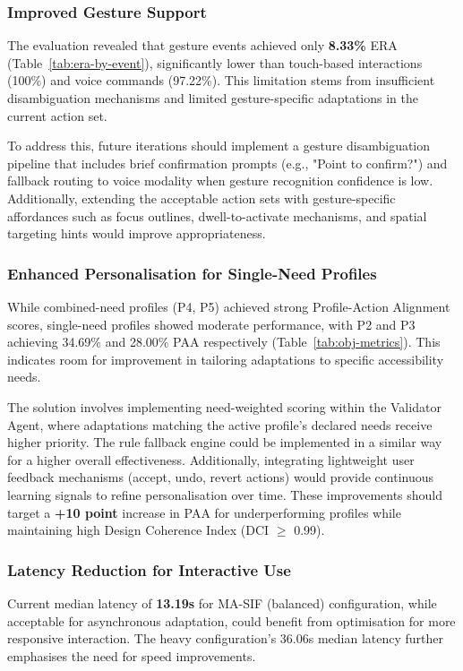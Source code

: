\subsubsection{Improved Gesture Support}
The evaluation revealed that gesture events achieved only \textbf{8.33\%} ERA (Table~\ref{tab:era-by-event}), significantly lower than touch-based interactions (100\%) and voice commands (97.22\%). This limitation stems from insufficient disambiguation mechanisms and limited gesture-specific adaptations in the current action set.

To address this, future iterations should implement a gesture disambiguation pipeline that includes brief confirmation prompts (e.g., "Point to confirm?") and fallback routing to voice modality when gesture recognition confidence is low. Additionally, extending the acceptable action sets with gesture-specific affordances such as focus outlines, dwell-to-activate mechanisms, and spatial targeting hints would improve appropriateness.

\subsubsection{Enhanced Personalisation for Single-Need Profiles}
While combined-need profiles (P4, P5) achieved strong Profile-Action Alignment scores, single-need profiles showed moderate performance, with P2 and P3 achieving 34.69\% and 28.00\% PAA respectively (Table~\ref{tab:obj-metrics}). This indicates room for improvement in tailoring adaptations to specific accessibility needs.

The solution involves implementing need-weighted scoring within the Validator Agent, where adaptations matching the active profile's declared needs receive higher priority. The rule fallback engine could be implemented in a similar way for a higher overall effectiveness. Additionally, integrating lightweight user feedback mechanisms (accept, undo, revert actions) would provide continuous learning signals to refine personalisation over time. These improvements should target a \textbf{+10 point} increase in PAA for underperforming profiles while maintaining high Design Coherence Index (DCI $\geq$ 0.99).

\subsubsection{Latency Reduction for Interactive Use}
Current median latency of \textbf{13.19s} for MA-SIF (balanced) configuration, while acceptable for asynchronous adaptation, could benefit from optimisation for more responsive interaction. The heavy configuration's 36.06s median latency further emphasises the need for speed improvements.

